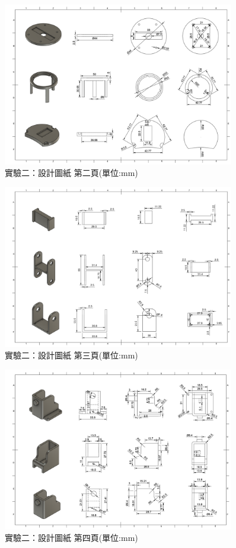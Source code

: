 \documentclass[class=NCU_thesis, crop=false]{standalone}
\begin{document}
\begin{figure}[htbp]
    \centering
    \includegraphics[width=0.9\textwidth]{figures/Armv2 (2).PNG}
    \caption{實驗二：設計圖紙 第二頁(單位:mm)}
\end{figure}

\begin{figure}[htbp]
    \centering
    \includegraphics[width=0.9\textwidth]{figures/Armv2 (3).PNG}
    \caption{實驗二：設計圖紙 第三頁(單位:mm)}
\end{figure}

\begin{figure}[htbp]
    \centering
    \includegraphics[width=0.9\textwidth]{figures/Armv2 (4).PNG}
    \caption{實驗二：設計圖紙 第四頁(單位:mm)}
\end{figure}
\end{document}
